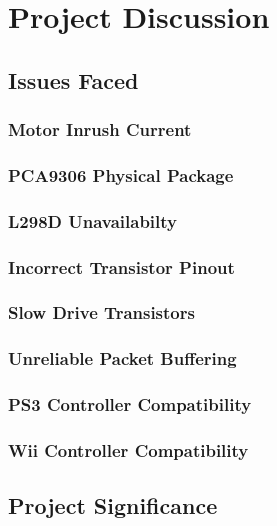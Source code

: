 \chapter{Project Discussion}
\label{chp:discussion}


\section{Issues Faced}


\subsection{Motor Inrush Current}


\subsection{PCA9306 Physical Package}


\subsection{L298D Unavailabilty}


\subsection{Incorrect Transistor Pinout}


\subsection{Slow Drive Transistors}


\subsection{Unreliable Packet Buffering}


\subsection{PS3 Controller Compatibility}


\subsection{Wii Controller Compatibility}


\section{Project Significance}

